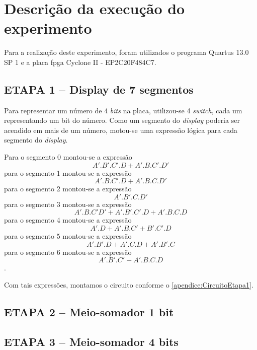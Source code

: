 
\chapter{Descrição da execução do experimento}

	Para a realização deste experimento, foram utilizados o programa Quartus 13.0 SP 1 e a placa \ac{fpga}
Cyclone II - EP2C20F484C7.

	\section{ETAPA 1 – Display de 7 segmentos}
		Para representar um número de 4 \textit{bits} na placa, utilizou-se 4 \textit{switch}, cada um
		representando um bit do número. Como um segmento do \textit{display} poderia ser acendido
		em mais de um número,
		motou-se uma expressão lógica para cada segmento do \textit{display}.

		Para o segmento 0 montou-se a expressão
		$$A'.B'.C'.D+A'.B.C'.D'$$
		para o segmento 1 montou-se a expressão
		$$A'.B.C'.D+A'.B.C.D'$$
		para o segmento 2 montou-se a expressão
		$$A'.B'.C.D'$$
		para o segmento 3 montou-se a expressão
		$$A'.B.C'D'+A'.B'.C'.D+A'.B.C.D$$
		para o segmento 4 montou-se a expressão
		$$A'.D+A'.B.C'+B'.C'.D$$
		para o segmento 5 montou-se a expressão
		$$A'.B'.D+A'.C.D+A'.B'.C$$
		para o segmento 6 montou-se a expressão
		$$A'.B'.C'+A'.B.C.D$$.

		Com tais expressões, montamos o circuito conforme o \autoref{apendice:CircuitoEtapa1}.

	\section{ETAPA 2 – Meio-somador 1 bit}

	\section{ETAPA 3 – Meio-somador 4 bits}









